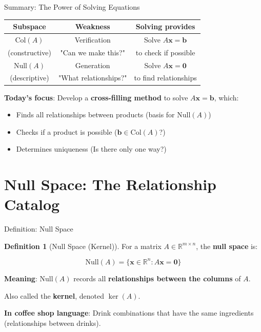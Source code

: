 \documentclass[10pt]{beamer}
\theoremstyle{definition}
\newtheorem{defi}{Definition}[section]
\newcommand{\x}[1]{\alert{\textbf{#1}}}
\begin{document}
\begin{frame}{Summary: The Power of Solving Equations}

\begin{center}
\begin{tabular}{|c|c|c|}
\hline
\textbf{Subspace} & \textbf{Weakness} & \textbf{Solving provides} \\
\hline
$\text{Col}(A)$ & Verification & Solve $A\mathbf{x}=\mathbf{b}$ \\
(constructive) & "Can we make this?" & to check if possible \\
\hline
$\text{Null}(A)$ & Generation & Solve $A\mathbf{x}=\mathbf{0}$ \\
(descriptive) & "What relationships?" & to find relationships \\
\hline
\end{tabular}
\end{center}

\vspace{1em}

\x{Today's focus}: Develop a \textbf{cross-filling method} to solve $A\mathbf{x} = \mathbf{b}$, which:

\begin{itemize}
\item Finds all relationships between products (basis for $\text{Null}(A)$)
\item Checks if a product is possible ($\mathbf{b} \in \text{Col}(A)$?)
\item Determines uniqueness (Is there only one way?)
\end{itemize}

\end{frame}

\section{Null Space: The Relationship Catalog}

\begin{frame}{Definition: Null Space}

\begin{defi}[Null Space (Kernel)]
For a matrix $A \in \mathbb{R}^{m \times n}$, the \x{null space} is:

$$\text{Null}(A) = \{\mathbf{x} \in \mathbb{R}^n : A\mathbf{x} = \mathbf{0}\}$$

\textbf{Meaning}: $\text{Null}(A)$ records all \x{relationships between the columns} of $A$.

Also called the \x{kernel}, denoted $\ker(A)$.
\end{defi}

\vspace{0.5em}

\x{In coffee shop language}: Drink combinations that have the same ingredients (relationships between drinks).

\end{frame}
\end{document}
